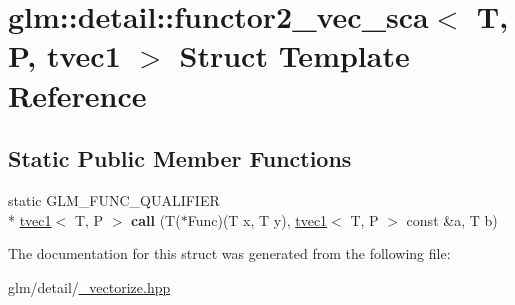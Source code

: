 \hypertarget{structglm_1_1detail_1_1functor2__vec__sca_3_01T_00_01P_00_01tvec1_01_4}{\section{glm\-:\-:detail\-:\-:functor2\-\_\-vec\-\_\-sca$<$ T, P, tvec1 $>$ Struct Template Reference}
\label{structglm_1_1detail_1_1functor2__vec__sca_3_01T_00_01P_00_01tvec1_01_4}
}
\subsection*{Static Public Member Functions}
\begin{DoxyCompactItemize}
\item 
\hypertarget{structglm_1_1detail_1_1functor2__vec__sca_3_01T_00_01P_00_01tvec1_01_4_a2a66b135799442e1bdee02afc859064d}{static G\-L\-M\-\_\-\-F\-U\-N\-C\-\_\-\-Q\-U\-A\-L\-I\-F\-I\-E\-R \\*
\hyperlink{structglm_1_1tvec1}{tvec1}$<$ T, P $>$ {\bfseries call} (T($\ast$Func)(T x, T y), \hyperlink{structglm_1_1tvec1}{tvec1}$<$ T, P $>$ const \&a, T b)}\label{structglm_1_1detail_1_1functor2__vec__sca_3_01T_00_01P_00_01tvec1_01_4_a2a66b135799442e1bdee02afc859064d}

\end{DoxyCompactItemize}


The documentation for this struct was generated from the following file\-:\begin{DoxyCompactItemize}
\item 
glm/detail/\hyperlink{__vectorize_8hpp}{\-\_\-vectorize.\-hpp}\end{DoxyCompactItemize}
